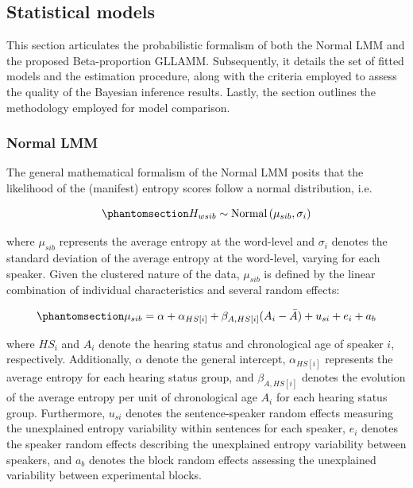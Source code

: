 \documentclass[
sn-apacite
]{sn-jnl}
\begin{document}
\subsection{Statistical models}\label{sec-M-SM}

This section articulates the probabilistic formalism of both the Normal
LMM and the proposed Beta-proportion GLLAMM. Subsequently, it details
the set of fitted models and the estimation procedure, along with the
criteria employed to assess the quality of the Bayesian inference
results. Lastly, the section outlines the methodology employed for model
comparison.

\subsubsection{Normal LMM}\label{sec-M-SM-NLMM}

The general mathematical formalism of the Normal LMM posits that the
likelihood of the (manifest) entropy scores follow a normal
distribution, i.e.

\begin{equation}\phantomsection\label{eq-normal-LMM-likelihood}{
H_{wsib} \sim \text{Normal} \left( \mu_{sib}, \sigma_{i} \right)
}\end{equation}

where \(\mu_{sib}\) represents the average entropy at the word-level and
\(\sigma_{i}\) denotes the standard deviation of the average entropy at
the word-level, varying for each speaker. Given the clustered nature of
the data, \(\mu_{sib}\) is defined by the linear combination of
individual characteristics and several random effects:

\begin{equation}\phantomsection\label{eq-normal-LMM-linearpred}{
\mu_{sib} = \alpha + \alpha_{HS[i]} + \beta_{A, HS[i]} (A_{i} - \bar{A}) + u_{si} + e_{i} + a_{b}
}\end{equation}

where \(HS_{i}\) and \(A_{i}\) denote the hearing status and
chronological age of speaker \(i\), respectively. Additionally,
\(\alpha\) denote the general intercept, \(\alpha_{HS[i]}\) represents
the average entropy for each hearing status group, and
\(\beta_{A,HS[i]}\) denotes the evolution of the average entropy per
unit of chronological age \(A_{i}\) for each hearing status group.
Furthermore, \(u_{si}\) denotes the sentence-speaker random effects
measuring the unexplained entropy variability within sentences for each
speaker, \(e_{i}\) denotes the speaker random effects describing the
unexplained entropy variability between speakers, and \(a_{b}\) denotes
the block random effects assessing the unexplained variability between
experimental blocks.
\end{document}
